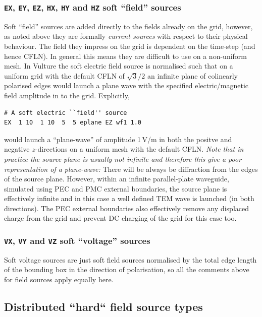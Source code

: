 \documentclass[onecolumn,a4paper]{article}
\numberwithin{equation}{section}
\begin{document}
\subsubsection{\texttt{EX}, \texttt{EY}, \texttt{EZ}, \texttt{HX}, \texttt{HY} and \texttt{HZ} soft ``field'' sources}

Soft ``field'' sources are added directly to the fields already on the grid, however, as noted above they
are formally {\em current sources} with respect to their physical behaviour. The field they impress on the grid
is dependent on the time-step (and hence CFLN). In general this means they are difficult to use on a
non-uniform mesh. In Vulture the soft electric field source is normalised such that on a uniform grid with the
default CFLN of $\sqrt{3}/2$ an infinite plane of colinearly polarised edges would launch a plane 
wave with the specified electric/magnetic field amplitude in to the grid. Explicitly,
\begin{verbatim}
# A soft electric ``field'' source
EX  1 10  1 10  5  5 eplane EZ wf1 1.0
\end{verbatim}
would launch a ``plane-wave'' of amplitude 1\,V/m in both the positve and negative $z$-directions
on a uniform mesh with the default CFLN. {\em Note that in practice the source plane is usually not infinite 
and therefore this give a poor representation of a plane-wave:} There will be always be diffraction 
from the edges of the source plane. However, within an infinite parallel-plate waveguide, simulated using
PEC and PMC external boundaries, the source plane is effectively infinite and in this case a well defined
TEM wave is launched (in both directions). The PEC external boundaries also effectively remove any displaced charge from the
grid and prevent DC charging of the grid for this case too.

\subsubsection{\texttt{VX}, \texttt{VY} and \texttt{VZ} soft ``voltage'' sources}

Soft voltage sources are just soft field sources normalised by the total edge length of 
the bounding box in the direction of polarisation, so all the comments above for field sources 
apply equally here.

\subsection{Distributed ``hard`` field source types}
\end{document}

